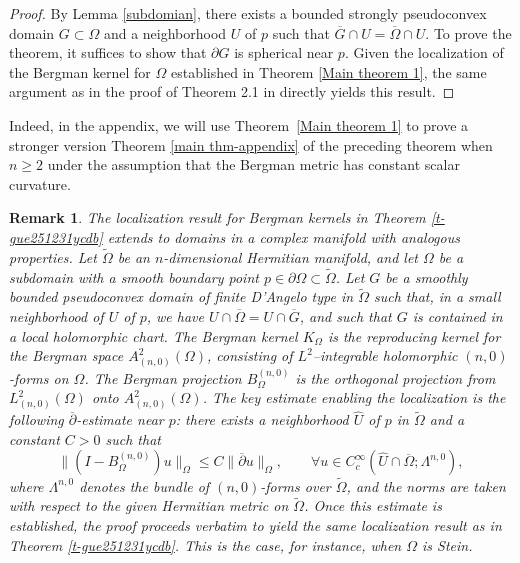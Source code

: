 \documentclass[a4paper,centertags,oneside,12pt]{amsart}
\newcommand{\p}{\partial}
\newtheorem{theorem}{Theorem}[section]
\newtheorem{remark}[theorem]{Remark}
\numberwithin{equation}{section}
\begin{document}
\begin{proof}
By Lemma \ref{subdomian}, there exists  a bounded strongly pseudoconvex domain $G\subset \Omega$  and a neighborhood $U$ of $p$ such that $\overline G\cap U=\overline\Omega\cap U$. To prove the theorem, it suffices to show that $\partial G$ is spherical near $p$. Given the localization of the Bergman kernel for $\Omega$ established in Theorem \ref{Main theorem 1}, the same argument as in the proof of Theorem 2.1 in \cite{HL23} directly yields this result.
\end{proof}
Indeed, in the appendix, we will use Theorem~\ref{Main theorem 1} to prove a stronger version Theorem  \ref{main thm-appendix} of the preceding theorem when $n\ge 2$ under the assumption that the Bergman metric has constant scalar curvature.



\begin{remark}

The localization result for Bergman kernels in Theorem \ref{t-gue251231ycdb} extends  to domains in a complex manifold with analogous properties. 
Let $\widetilde\Omega$  be an $n$-dimensional Hermitian manifold, and let  $\Omega$  be a subdomain with a smooth  boundary point  $p\in \p\Omega\subset \widetilde{\Omega}$.
Let $G$  be a smoothly bounded pseudoconvex domain of finite D'Angelo type in   $\widetilde{\Omega}$ such that, in a small neighborhood  of  $U$ of $p$, we have $U\cap\overline\Omega = U\cap\overline G$, and such that  $G$ is contained in a local holomorphic chart.
		The Bergman kernel  $K_\Omega$ is the reproducing kernel for the Bergman space $A^2_{(n,0)}(\Omega)$, consisting of $L^2$--integrable holomorphic $(n, 0)$-forms on $\Omega$. The Bergman projection   $B_\Omega^{(n,0)}$ is the orthogonal projection from  $L^2_{(n,0)}(\Omega)$ onto $A^2_{(n,0)}(\Omega)$.
		The key estimate enabling the localization is the following $\overline\partial$-estimate near $p$: there exists a neighborhood 
      $\widehat U$ of $p$ in $\widetilde\Omega$ and a constant $C>0$ such that 
\[
\|(I - B_\Omega^{(n,0)})u\|_\Omega \leq C \|\overline\partial u\|_\Omega, \qquad \forall u \in C_c^\infty(\widehat U\cap\overline\Omega; \Lambda^{n,0}),
\]
 where $\Lambda^{n,0}$ denotes the bundle of $(n,0)$-forms over $\widetilde\Omega$, and the norms are taken with respect to the given Hermitian metric on $\widetilde\Omega$. Once this estimate is established, the proof proceeds verbatim to yield the same localization result as in Theorem \ref{t-gue251231ycdb}. This is the case, for instance, when $\Omega$ is Stein.
\end{remark}
\end{document}
